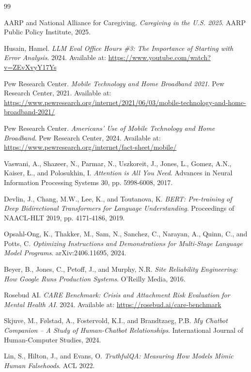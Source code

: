 \documentclass{article}
\begin{document}
\begin{thebibliography}{99}

AARP and National Alliance for Caregiving.
\textit{Caregiving in the U.S. 2025}.
AARP Public Policy Institute, 2025.

Husain, Hamel.
\textit{LLM Eval Office Hours \#3: The Importance of Starting with Error Analysis}.
2024.
Available at: \url{https://www.youtube.com/watch?v=ZEvXvyY17Ys}

Pew Research Center.
\textit{Mobile Technology and Home Broadband 2021}.
Pew Research Center, 2021.
Available at: \url{https://www.pewresearch.org/internet/2021/06/03/mobile-technology-and-home-broadband-2021/}

Pew Research Center.
\textit{Americans' Use of Mobile Technology and Home Broadband}.
Pew Research Center, 2024.
Available at: \url{https://www.pewresearch.org/internet/fact-sheet/mobile/}

Vaswani, A., Shazeer, N., Parmar, N., Uszkoreit, J., Jones, L., Gomez, A.N., Kaiser, Ł., and Polosukhin, I.
\textit{Attention is All You Need}.
Advances in Neural Information Processing Systems 30, pp. 5998-6008, 2017.

Devlin, J., Chang, M.W., Lee, K., and Toutanova, K.
\textit{BERT: Pre-training of Deep Bidirectional Transformers for Language Understanding}.
Proceedings of NAACL-HLT 2019, pp. 4171-4186, 2019.

Opsahl-Ong, K., Thakker, M., Sam, N., Sanchez, C., Narayan, A., Quinn, C., and Potts, C.
\textit{Optimizing Instructions and Demonstrations for Multi-Stage Language Model Programs}.
arXiv:2406.11695, 2024.

Beyer, B., Jones, C., Petoff, J., and Murphy, N.R.
\textit{Site Reliability Engineering: How Google Runs Production Systems}.
O'Reilly Media, 2016.

Rosebud AI.
\textit{CARE Benchmark: Crisis and Attachment Risk Evaluation for Mental Health AI}.
2024. Available at: \url{https://rosebud.ai/care-benchmark}

Skjuve, M., Følstad, A., Fostervold, K.I., and Brandtzaeg, P.B.
\textit{My Chatbot Companion -- A Study of Human-Chatbot Relationships}.
International Journal of Human-Computer Studies, 2024.

Lin, S., Hilton, J., and Evans, O.
\textit{TruthfulQA: Measuring How Models Mimic Human Falsehoods}.
ACL 2022.


\end{thebibliography}
\end{document}
